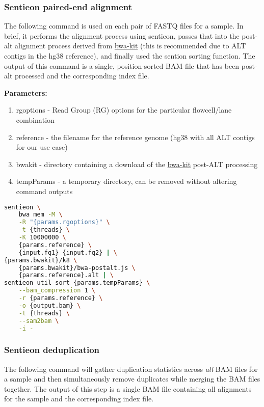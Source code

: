 \subsubsection{Sentieon paired-end alignment}
The following command is used on each pair of FASTQ files for a sample.  In brief, it performs the alignment process using sentieon, passes that into the post-alt alignment process derived from \href{https://github.com/lh3/bwa/blob/master/README-alt.md}{bwa-kit} (this is recommended due to ALT contigs in the hg38 reference), and finally used the sention sorting function.  The output of this command is a single, position-sorted BAM file that has been post-alt processed and the corresponding index file.

\noindent\textbf{Parameters:}
\begin{enumerate}
    \item rgoptions - Read Group (RG) options for the particular flowcell/lane combination
    \item reference - the filename for the reference genome (hg38 with all ALT contigs for our use case)
    \item bwakit - directory containing a download of the \href{https://github.com/lh3/bwa/blob/master/README-alt.md}{bwa-kit} post-ALT processing
    \item tempParams - a temporary directory, can be removed without altering command outputs
\end{enumerate}

\begin{lstlisting}[language=bash]
sentieon \
    bwa mem -M \
    -R "{params.rgoptions}" \
    -t {threads} \
    -K 10000000 \
    {params.reference} \
    {input.fq1} {input.fq2} | \
{params.bwakit}/k8 \
    {params.bwakit}/bwa-postalt.js \
    {params.reference}.alt | \
sentieon util sort {params.tempParams} \
    --bam_compression 1 \
    -r {params.reference} \
    -o {output.bam} \
    -t {threads} \
    --sam2bam \
    -i -
\end{lstlisting}

\subsubsection{Sentieon deduplication}
The following command will gather duplication statistics across \textit{all} BAM files for a sample and then simultaneously remove duplicates while merging the BAM files together.  The output of this step is a single BAM file containing all alignments for the sample and the corresponding index file.

